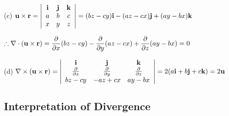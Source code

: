 \documentclass[11pt, a4paper]{MATH2023}
\begin{document}
\begin{spacing}{1.3}
    (c) $\displaystyle \mathbf{u} \times \mathbf{r}=\left|\begin{array}{ccc}
            \mathbf{i} & \mathbf{j} & \mathbf{k} \\ 
            a & b & c \\ 
            x & y & z
        \end{array}\right|=(b z-c y) \mathbf{i}-(a z-c x) \mathbf{j}+(a y-b x) \mathbf{k}$

    $\displaystyle \therefore \nabla \cdot(\mathbf{u} \times \mathbf{r})=\frac{\partial}{\partial x}(b z-c y)-\frac{\partial}{\partial y}(a z-c x)+\frac{\partial}{\partial z}(a y-b x)=0$

    (d) $\displaystyle \nabla \times(\mathbf{u} \times \mathbf{r})=\left|\begin{array}{ccc}\mathbf{i} & \mathbf{j} & \mathbf{k} \\ \frac{\partial}{\partial x} & \frac{\partial}{\partial y} & \frac{\partial}{\partial z} \\ b z-c y & -a z+c x & a y-b x\end{array}\right|=2(a \mathbf{i}+b \mathbf{j}+c \mathbf{k})=2 \mathbf{u}$


    \newpage
    \subsection{Interpretation of Divergence}

    \newcommand{\uu}{{\bf u}}


\end{spacing}
\end{document}
